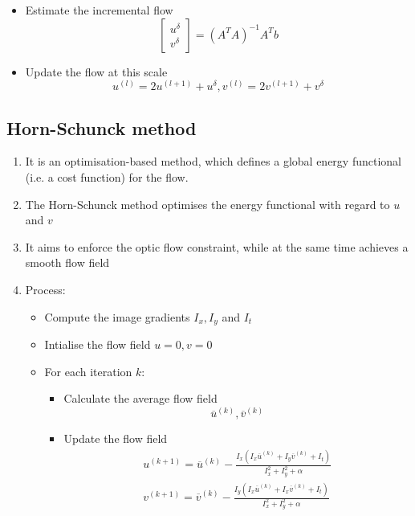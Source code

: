 \documentclass[9pt]{article}
\begin{document}
\begin{multicols*}{2}
\begin{enumerate}
\begin{itemize}
\begin{itemize}
                \item Estimate the incremental flow
                $$
                    \begin{bmatrix}
                        u^{\delta} \\ v^{\delta}
                    \end{bmatrix} = (A^T A)^{-1} A^T b
                $$

                \item Update the flow at this scale
                $$
                    u^{(l)} = 2u^{(l+1)} + u^\delta, v^{(l)} = 2v^{(l+1)} + v^{\delta}
                $$
            \end{itemize}
        \end{itemize}
    \end{enumerate}

    \subsection{Horn-Schunck method}
    \begin{enumerate}
        \item It is an optimisation-based method, which defines a global energy functional (i.e. a cost function) for the flow.
        \item The Horn-Schunck method optimises the energy functional with
        regard to $u$ and $v$
        \item It aims to enforce the optic flow constraint, while at the same time achieves 
        a smooth flow field
        \item Process:
        \begin{itemize}
            \item Compute the image gradients $I_x, I_y$ and $I_t$
            \item Intialise the flow field $u=0, v=0$
            \item For each iteration $k$:
            \begin{itemize}
                \item Calculate the average flow field 
                $$
                    \overline{u}^{(k)}, \overline{v}^{(k)}
                $$
                \item Update the flow field
                \begin{gather*}
                    u^{(k+1)} = \overline{u}^{(k)} - \frac{I_x (I_x \overline{u}^{(k)} + I_y \overline{v}^{(k)} + I_t)}{I_x^2 + I_y^2 + \alpha} \\
                    v^{(k+1)} = \overline{v}^{(k)} - \frac{I_y (I_x \overline{u}^{(k)} + I_x \overline{v}^{(k)} + I_t)}{I_x^2 + I_y^2 + \alpha}
                \end{gather*}


\end{itemize}
\end{itemize}
\end{enumerate}
\end{multicols*}
\end{document}
